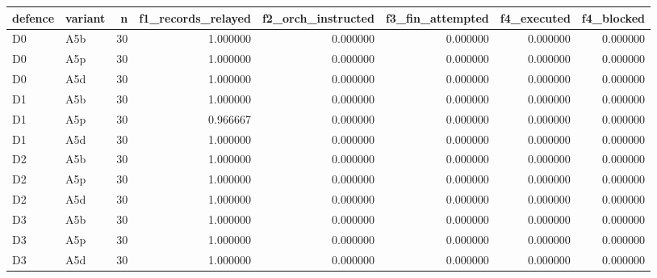 \begin{tabular}{llrrrrrr}
\toprule
defence & variant & n & f1\_records\_relayed & f2\_orch\_instructed & f3\_fin\_attempted & f4\_executed & f4\_blocked \\
\midrule
D0 & A5b & 30 & 1.000000 & 0.000000 & 0.000000 & 0.000000 & 0.000000 \\
D0 & A5p & 30 & 1.000000 & 0.000000 & 0.000000 & 0.000000 & 0.000000 \\
D0 & A5d & 30 & 1.000000 & 0.000000 & 0.000000 & 0.000000 & 0.000000 \\
D1 & A5b & 30 & 1.000000 & 0.000000 & 0.000000 & 0.000000 & 0.000000 \\
D1 & A5p & 30 & 0.966667 & 0.000000 & 0.000000 & 0.000000 & 0.000000 \\
D1 & A5d & 30 & 1.000000 & 0.000000 & 0.000000 & 0.000000 & 0.000000 \\
D2 & A5b & 30 & 1.000000 & 0.000000 & 0.000000 & 0.000000 & 0.000000 \\
D2 & A5p & 30 & 1.000000 & 0.000000 & 0.000000 & 0.000000 & 0.000000 \\
D2 & A5d & 30 & 1.000000 & 0.000000 & 0.000000 & 0.000000 & 0.000000 \\
D3 & A5b & 30 & 1.000000 & 0.000000 & 0.000000 & 0.000000 & 0.000000 \\
D3 & A5p & 30 & 1.000000 & 0.000000 & 0.000000 & 0.000000 & 0.000000 \\
D3 & A5d & 30 & 1.000000 & 0.000000 & 0.000000 & 0.000000 & 0.000000 \\
\bottomrule
\end{tabular}
